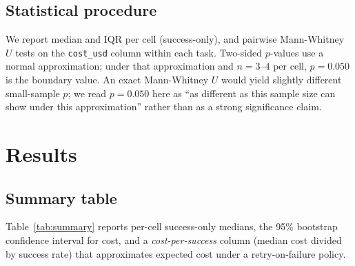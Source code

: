 \documentclass[11pt,a4paper]{article}
\begin{document}
\subsection{Statistical procedure}

We report median and IQR per cell (success-only), and pairwise Mann-Whitney $U$ tests on the \texttt{cost\_usd} column within each task. Two-sided $p$-values use a normal approximation; under that approximation and $n = 3$--$4$ per cell, $p = 0.050$ is the boundary value. An exact Mann-Whitney $U$ would yield slightly different small-sample $p$; we read $p = 0.050$ here as ``as different as this sample size can show under this approximation'' rather than as a strong significance claim.

\section{Results}

\subsection{Summary table}

Table~\ref{tab:summary} reports per-cell success-only medians, the 95\% bootstrap confidence interval for cost, and a \emph{cost-per-success} column (median cost divided by success rate) that approximates expected cost under a retry-on-failure policy.
\end{document}

